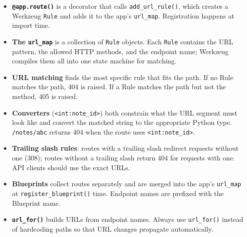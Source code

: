 \label{32-routing:key-takeaways}
\begin{takeaways}

\begin{itemize}
\tightlist
\item
  \textbf{\texttt{@app.route()}} is a decorator that calls \texttt{add\_url\_rule()}, which creates a Werkzeug \texttt{Rule} and adds it to the app's \texttt{url\_map}. Registration happens at import time.
\item
  \textbf{The \texttt{url\_map}} is a collection of \texttt{Rule} objects. Each \texttt{Rule} contains the URL pattern, the allowed HTTP methods, and the endpoint name; Werkzeug compiles them all into one state machine for matching.
\item
  \textbf{URL matching} finds the most specific rule that fits the path. If no Rule matches the path, 404 is raised. If a Rule matches the path but not the method, 405 is raised.
\item
  \textbf{Converters} (\texttt{\textless{}int:note\_id\textgreater{}}) both constrain what the URL segment must look like and convert the matched string to the appropriate Python type. \texttt{/notes/abc} returns 404 when the route uses \texttt{\textless{}int:note\_id\textgreater{}}.
\item
  \textbf{Trailing slash rules}: routes with a trailing slash redirect requests without one (308); routes without a trailing slash return 404 for requests with one. API clients should use the exact URLs.
\item
  \textbf{Blueprints} collect routes separately and are merged into the app's \texttt{url\_map} at \texttt{register\_blueprint()} time. Endpoint names are prefixed with the Blueprint name.
\item
  \textbf{\texttt{url\_for()}} builds URLs from endpoint names. Always use \texttt{url\_for()} instead of hardcoding paths so that URL changes propagate automatically.
\end{itemize}

\end{takeaways}

\label{32-routing:exercises}

